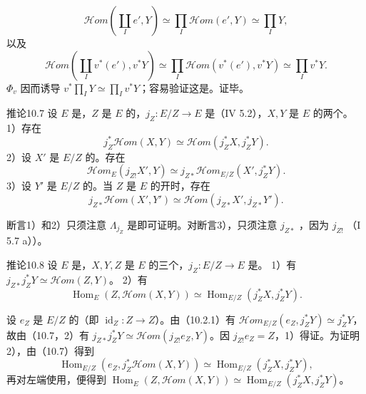 \[
\mathscr{H}\!om(\coprod_I e',Y)\simeq\prod_I\mathscr{H}\!om(e',Y)\simeq\prod_IY,
\]
以及
\[
\mathscr{H}\!om(\coprod_Iv^*(e'),v^*Y)\simeq\prod_I\mathscr{H}\!om(v^*(e'),v^*Y)\simeq\prod_Iv^*Y.
\]
 $\Phi_v$ 因而诱导 $v^*\prod_IY\simeq\prod_Iv^*Y$；容易验证这是。证毕。
\begin{SGAresult}{推论}{10.7}
设 $E$ 是，$Z$ 是 $E$ 的，$j_Z:E/Z\to E$ 是（IV 5.2），$X,Y$ 是 $E$ 的两个。
1）存在
\[j_Z^*\mathscr{H}\!om(X,Y)\simeq\mathscr{H}\!om(j_Z^*X,j_Z^*Y).\]
2）设 $X'$ 是 $E/Z$ 的。存在
\[\mathscr{H}\!om_E(j_{Z!}X',Y)\simeq j_{Z*}\mathscr{H}\!om_{E/Z}(X',j_Z^*Y).\]
3）设 $Y'$ 是 $E/Z$ 的。当 $Z$ 是 $E$ 的开时，存在
\[j_{Z*}\mathscr{H}\!om(X',Y')\simeq\mathscr{H}\!om(j_{Z*}X',j_{Z*}Y').\]
\end{SGAresult}
断言1）和2）只须注意 $\Lambda_{j_Z}$ 是即可证明。对断言3），只须注意 $j_{Z*}$ ，因为 $j_{Z!}$ （I 5.7 a））。
\begin{SGAresult}{推论}{10.8}
设 $E$ 是，$X,Y,Z$ 是 $E$ 的三个，$j_Z:E/Z\to E$ 是。
1）有 $j_{Z*}j_Z^*Y\simeq\mathscr{H}\!om(Z,Y)$。
2）有
\[\operatorname{Hom}_E(Z,\mathscr{H}\!om(X,Y))\simeq\operatorname{Hom}_{E/Z}(j_Z^*X,j_Z^*Y).\]
\end{SGAresult}
设 $e_Z$ 是 $E/Z$ 的（即 $\operatorname{id}_Z:Z\to Z$）。由（10.2.1）有 $\mathscr{H}\!om_{E/Z}(e_Z,j_Z^*Y)\simeq j_Z^*Y$，故由（10.7，2）有 $j_{Z*}j_Z^*Y\simeq\mathscr{H}\!om(j_{Z!}e_Z,Y)$。因 $j_{Z!}e_Z=Z$，1）得证。为证明2），由（10.7）得到
\[
\operatorname{Hom}_{E/Z}(e_Z,j_Z^*\mathscr{H}\!om(X,Y))\simeq\operatorname{Hom}_{E/Z}(j_Z^*X,j_Z^*Y),
\]
再对左端使用，便得到
$\operatorname{Hom}_E(Z,\mathscr{H}\!om(X,Y))\simeq\operatorname{Hom}_{E/Z}(j_Z^*X,j_Z^*Y)$。

